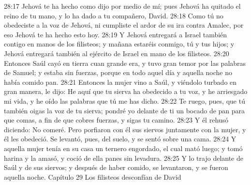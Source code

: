 28:17 Jehová te ha hecho como dijo por medio de mí; pues Jehová ha quitado el reino de tu mano, y lo ha dado a tu compañero, David.  
28:18 Como tú no obedeciste a la voz de Jehová, ni cumpliste el ardor de su ira contra Amalec, por eso Jehová te ha hecho esto hoy. 
28:19 Y Jehová entregará a Israel también contigo en manos de los filisteos; y mañana estaréis conmigo, tú y tus hijos; y Jehová entregará también al ejército de Israel en mano de los filisteos.  
28:20 Entonces Saúl cayó en tierra cuan grande era, y tuvo gran temor por las palabras de Samuel; y estaba sin fuerzas, porque en todo aquel día y aquella noche no había comido pan.  
28:21 Entonces la mujer vino a Saúl, y viéndolo turbado en gran manera, le dijo: He aquí que tu sierva ha obedecido a tu voz, y he arriesgado mi vida, y he oído las palabras que tú me has dicho.  
28:22 Te ruego, pues, que tú también oigas la voz de tu sierva; pondré yo delante de ti un bocado de pan para que comas, a fin de que cobres fuerzas, y sigas tu camino.  
28:23 Y él rehusó diciendo: No comeré. Pero porfiaron con él sus siervos juntamente con la mujer, y él les obedeció. Se levantó, pues, del suelo, y se sentó sobre una cama.  
28:24 Y aquella mujer tenía en su casa un ternero engordado, el cual mató luego; y tomó harina y la amasó, y coció de ella panes sin levadura. 
28:25 Y lo trajo delante de Saúl y de sus siervos; y después de haber comido, se levantaron, y se fueron aquella noche.  
Capítulo 29
Los filisteos desconfían de David  

